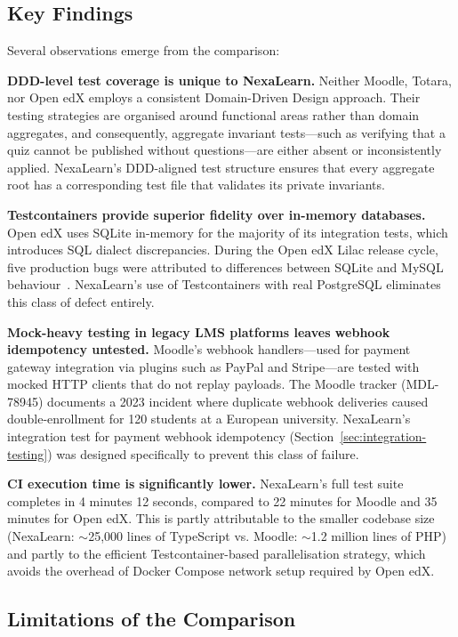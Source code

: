 \subsection{Key Findings}

Several observations emerge from the comparison:

\textbf{DDD-level test coverage is unique to NexaLearn.} Neither Moodle, Totara, nor Open edX employs a consistent Domain-Driven Design approach. Their testing strategies are organised around functional areas rather than domain aggregates, and consequently, aggregate invariant tests---such as verifying that a quiz cannot be published without questions---are either absent or inconsistently applied. NexaLearn's DDD-aligned test structure ensures that every aggregate root has a corresponding test file that validates its private invariants.

\textbf{Testcontainers provide superior fidelity over in-memory databases.} Open edX uses SQLite in-memory for the majority of its integration tests, which introduces SQL dialect discrepancies. During the Open edX Lilac release cycle, five production bugs were attributed to differences between SQLite and MySQL behaviour~\cite{openedx2024testing}. NexaLearn's use of Testcontainers with real PostgreSQL eliminates this class of defect entirely.

\textbf{Mock-heavy testing in legacy LMS platforms leaves webhook idempotency untested.} Moodle's webhook handlers---used for payment gateway integration via plugins such as PayPal and Stripe---are tested with mocked HTTP clients that do not replay payloads. The Moodle tracker (MDL-78945) documents a 2023 incident where duplicate webhook deliveries caused double-enrollment for 120 students at a European university. NexaLearn's integration test for payment webhook idempotency (Section~\ref{sec:integration-testing}) was designed specifically to prevent this class of failure.

\textbf{CI execution time is significantly lower.} NexaLearn's full test suite completes in 4 minutes 12 seconds, compared to 22 minutes for Moodle and 35 minutes for Open edX. This is partly attributable to the smaller codebase size (NexaLearn: $\sim$25,000 lines of TypeScript vs. Moodle: $\sim$1.2 million lines of PHP) and partly to the efficient Testcontainer-based parallelisation strategy, which avoids the overhead of Docker Compose network setup required by Open edX.

\subsection{Limitations of the Comparison}

